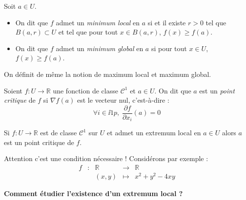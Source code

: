 \documentclass[french,11pt,twoside]{VcCours}
\begin{document}
\begin{Definition}{} Soit $a \in U$.
\begin{itemize}
\item On dit que $f$ admet un \emph{minimum local} en $a$ si et il existe $r >0$ tel que $B(a,r) \subset U$ et tel que pour tout $x \in B(a,r)$, $f(x) \geq f(a)$.
\item On dit que $f$ admet un \emph{minimum global} en $a$ si pour tout $x \in U$, $f(x) \geq f(a)$.
\end{itemize}
\end{Definition}

\begin{Remarque}{} On définit de même la notion de maximum local et maximum global.
\end{Remarque}

\begin{Definition}{}
Soient $f : U \rightarrow \mathbb{R}$ une fonction de classe $\mathcal{C}^1$ et $a \in U$. On dit que $a$ est un \emph{point critique} de $f$ si $\nabla f (a)$ est le vecteur nul, c'est-à-dire :
$$ \forall i \in \ii{1}{p}, \; \dfrac{\partial f}{\partial x_i}(a)= 0 $$
\end{Definition}

\begin{Proposition}{}
Si $f : U \rightarrow \mathbb{R}$ est de classe $\mathcal{C}^1$ sur $U$ et admet un extremum local en $a \in U$ alors $a$ est un point critique de $f$.
\end{Proposition}

\begin{Demonstration}{}

\vspace{5cm}
\end{Demonstration}


\begin{Remarque}{}
Attention c'est une condition nécessaire ! Considérons par exemple :
$$ \begin{array}{cccll}
f& : & \mathbb{R} & \rightarrow & \mathbb{R} \\
& & (x,y) & \mapsto & x^2+y^2-4xy 
\end{array}$$

\vspace{5cm}
\end{Remarque}

\medskip

\begin{center}
\textbf{Comment étudier l'existence d'un extremum local ?}
\end{center}
\end{document}
